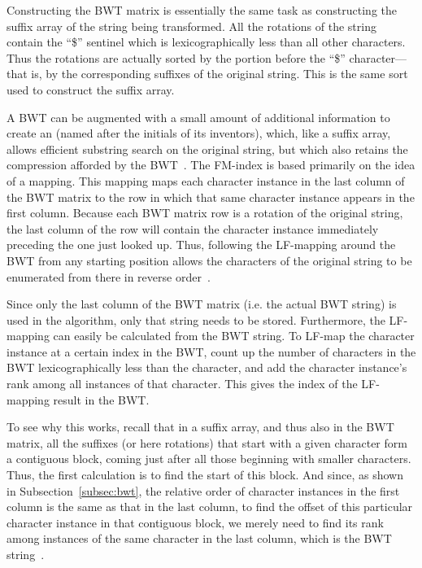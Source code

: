 Constructing the BWT matrix is essentially the same task as constructing the suffix array of the string being transformed. All the rotations of the string contain the ``\$'' sentinel which is lexicographically less than all other characters. Thus the rotations are actually sorted by the portion before the ``\$'' character---that is, by the corresponding suffixes of the original string. This is the same sort used to construct the suffix array.

A BWT can be augmented with a small amount of additional information to create an  (named after the initials of its inventors), which, like a suffix array, allows efficient substring search on the original string, but which also retains the compression afforded by the BWT~\cite{ferragina2000opportunistic}. The FM-index is based primarily on the idea of a  mapping. This mapping maps each character instance in the last column of the BWT matrix to the row in which that same character instance appears in the first column. Because each BWT matrix row is a rotation of the original string, the last column of the row will contain the character instance immediately preceding the one just looked up. Thus, following the LF-mapping around the BWT from any starting position allows the characters of the original string to be enumerated from there in reverse order~\cite{ferragina2000opportunistic}.

Since only the last column of the BWT matrix (i.e. the actual BWT string) is used in the algorithm, only that string needs to be stored. Furthermore, the LF-mapping can easily be calculated from the BWT string. To LF-map the character instance at a certain index in the BWT, count up the number of characters in the BWT lexicographically less than the character, and add the character instance's rank among all instances of that character. This gives the index of the LF-mapping result in the BWT.

To see why this works, recall that in a suffix array, and thus also in the BWT matrix, all the suffixes (or here rotations) that start with a given character form a contiguous block, coming just after all those beginning with smaller characters. Thus, the first calculation is to find the start of this block. And since, as shown in Subsection~\ref{subsec:bwt}, the relative order of character instances in the first column is the same as that in the last column, to find the offset of this particular character instance in that contiguous block, we merely need to find its rank among instances of the same character in the last column, which is the BWT string~\cite{langmead2013introduction}.

